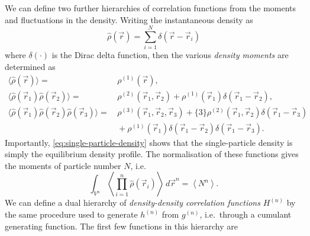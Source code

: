 We can define two further hierarchies of correlation functions from the moments and fluctuations in the density.
Writing the instantaneous density as
\begin{equation*}\label{eq:instantaneous-density}
  \widehat\rho(\vec{r}) = \sum_{i=1}^N \delta(\vec{r} - \vec{r}_i)
\end{equation*}
where $\delta(\cdot)$ is the Dirac delta function, then the various \emph{density moments} are determined as
\begin{subequations}\label{eq:density-moments}
  \begin{align}
    \langle \widehat\rho(\vec{r}) \rangle
    =& \,
    \rho^{(1)}(\vec{r}),
    \label{eq:single-particle-density}
    \\
    \big\langle \widehat\rho(\vec{r}_1) \widehat\rho(\vec{r}_2) \big\rangle
    =& \,
    \rho^{(2)}(\vec{r}_1, \vec{r}_2) +
    \rho^{(1)}(\vec{r}_1) \delta(\vec{r}_1 - \vec{r}_2),
    \\
    \big\langle \widehat\rho(\vec{r}_1) \widehat\rho(\vec{r}_2) \widehat\rho(\vec{r}_3) \big\rangle
    =& \,
    \rho^{(3)}(\vec{r}_1, \vec{r}_2, \vec{r}_3) +
    \{3\} \rho^{(2)}(\vec{r}_1, \vec{r}_2) \delta(\vec{r}_1 - \vec{r}_3)
    \nonumber \\ & \,
    + \rho^{(1)}(\vec{r}_1) \delta(\vec{r}_1 - \vec{r}_2) \delta(\vec{r}_1 - \vec{r}_3).
  \end{align}
\end{subequations}
Importantly, \eqref{eq:single-particle-density} shows that the single-particle density is simply the equilibrium density profile.
The normalisation of these functions gives the moments of particle number $N$, i.e.\
\begin{equation}
  \int_{V^n}
  \left\langle
  \prod_{i=1}^n \widehat\rho(\vec{r}_i)
  \right\rangle
  \, d\vec{r}^n
  =
  \left\langle N^n \right\rangle.
\end{equation}
We can define a dual hierarchy of \emph{density-density correlation functions} $H^{(n)}$ by the same procedure used to generate $h^{(n)}$ from $g^{(n)}$, i.e.\ through a cumulant generating function.
The first few functions in this hierarchy are
